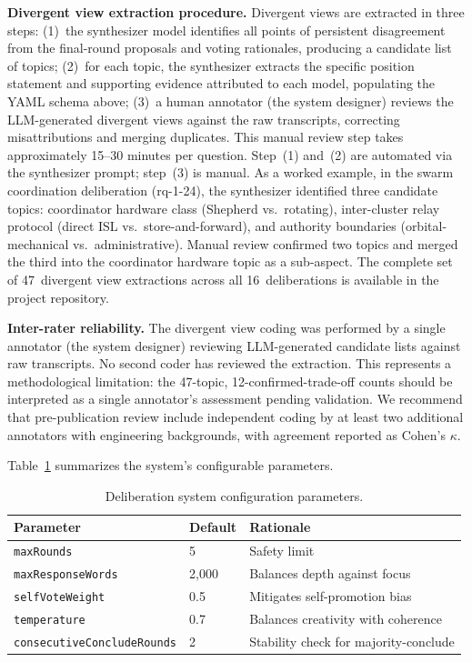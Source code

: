 \documentclass[11pt,a4paper]{article}
\begin{document}
\textbf{Divergent view extraction procedure.} Divergent views are extracted in three steps: (1)~the synthesizer model identifies all points of persistent disagreement from the final-round proposals and voting rationales, producing a candidate list of topics; (2)~for each topic, the synthesizer extracts the specific position statement and supporting evidence attributed to each model, populating the YAML schema above; (3)~a human annotator (the system designer) reviews the LLM-generated divergent views against the raw transcripts, correcting misattributions and merging duplicates. This manual review step takes approximately 15--30 minutes per question. Step~(1) and~(2) are automated via the synthesizer prompt; step~(3) is manual. As a worked example, in the swarm coordination deliberation (rq-1-24), the synthesizer identified three candidate topics: coordinator hardware class (Shepherd vs.\ rotating), inter-cluster relay protocol (direct ISL vs.\ store-and-forward), and authority boundaries (orbital-mechanical vs.\ administrative). Manual review confirmed two topics and merged the third into the coordinator hardware topic as a sub-aspect. The complete set of 47~divergent view extractions across all 16~deliberations is available in the project repository.

\textbf{Inter-rater reliability.} The divergent view coding was performed by a single annotator (the system designer) reviewing LLM-generated candidate lists against raw transcripts. No second coder has reviewed the extraction. This represents a methodological limitation: the 47-topic, 12-confirmed-trade-off counts should be interpreted as a single annotator's assessment pending validation. We recommend that pre-publication review include independent coding by at least two additional annotators with engineering backgrounds, with agreement reported as Cohen's $\kappa$.

Table~\ref{tab:config} summarizes the system's configurable parameters.

\begin{table}[ht]
\centering
\caption{Deliberation system configuration parameters.}
\label{tab:config}
\begin{tabular}{@{}llp{5.5cm}@{}}
\toprule
\textbf{Parameter} & \textbf{Default} & \textbf{Rationale} \\
\midrule
\texttt{maxRounds} & 5 & Safety limit \\
\texttt{maxResponseWords} & 2{,}000 & Balances depth against focus \\
\texttt{selfVoteWeight} & 0.5 & Mitigates self-promotion bias \\
\texttt{temperature} & 0.7 & Balances creativity with coherence \\
\texttt{consecutiveConcludeRounds} & 2 & Stability check for majority-conclude \\
\bottomrule
\end{tabular}
\end{table}
\end{document}
